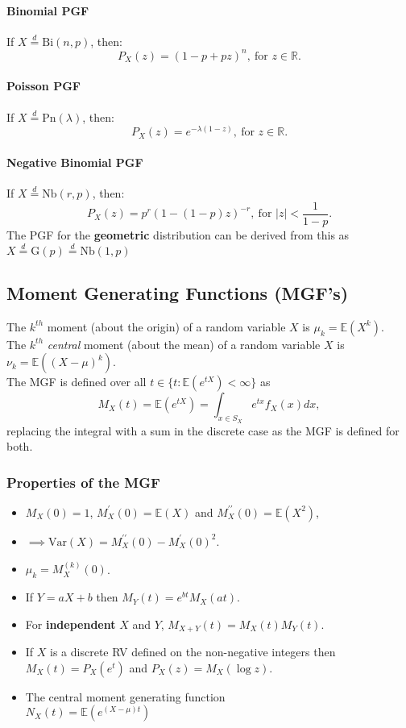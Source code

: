 \documentclass[titlepage,twocolumn]{article}
\begin{document}
\paragraph{Binomial PGF}
If $X\stackrel{d}{=}\mbox{Bi}(n,p)$, then: $$P_X(z) = (1-p+pz)^n,\ \mbox{for } z \in \mathbb{R}.$$
\paragraph{Poisson PGF}
If $X\stackrel{d}{=}\mbox{Pn}(\lambda)$, then: $$P_X(z) = e^{-\lambda (1-z)},\ \mbox{for } z \in \mathbb{R}.$$
\paragraph{Negative Binomial PGF}
If $X\stackrel{d}{=}\mbox{Nb}(r,p)$, then: $$P_X(z) = p^r(1-(1-p)z)^{-r},\ \mbox{for } |z| < \frac{1}{1-p}.$$ The PGF for the \textbf{geometric} distribution can be derived from this as $X\stackrel{d}{=}\mbox{G}(p)\stackrel{d}{=}\mbox{Nb}(1,p)$

\subsection*{Moment Generating Functions (MGF's)}
The $k^{th}$ moment (about the origin) of a random variable $X$ is $\mu_k = \mathbb{E}(X^k)$.\\[2mm]
The $k^{th}$ \textit{central} moment (about the mean) of a random variable $X$ is $\nu_k = \mathbb{E}((X-\mu)^k)$.\\[2mm]
The MGF is defined over all $t \in \{t: \mathbb{E}(e^{tX}) < \infty\}$ as $$M_X(t) = \mathbb{E}(e^{tX}) = \int_{x \in S_X}e^{tx}f_X(x)dx,$$ replacing the integral with a sum in the discrete case as the MGF is defined for both.
\subsubsection*{Properties of the MGF}
\begin{itemize}
    \item $M_X(0) = 1$, $M_X^\prime(0) = \mathbb{E}(X)$ and $M_X^{\prime\prime}(0) = \mathbb{E}(X^2)$,
    \item $\implies \mbox{Var}(X) = M_X^{\prime\prime}(0) - M_X^{\prime}(0)^2$.
    \item $\mu_k = M_X^{(k)}(0)$.
    \item If $Y = aX + b$ then $M_Y(t) = e^{bt}M_X(at)$.
    \item For \textbf{independent} $X$ and $Y$, $M_{X+Y}(t) = M_{X}(t)M_{Y}(t)$.
    \item If $X$ is a discrete RV defined on the non-negative integers then $M_X(t) = P_X(e^t)$ and $P_X(z) = M_X(\log z)$.
    \item The central moment generating function\\$N_X(t) = \mathbb{E}\left(e^{(X-\mu)t}\right)$
\end{itemize}
\end{document}
